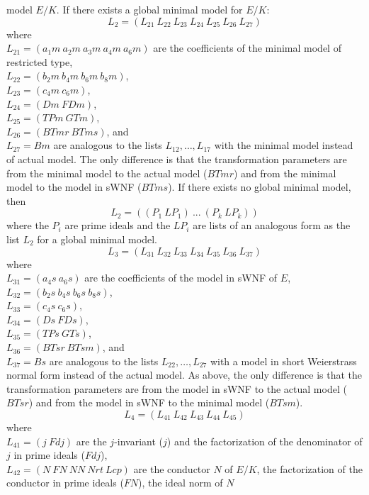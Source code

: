 model $E/K$.
\leer
If there exists a global minimal model for $E/K$:
$$
        L_2 = (L_{21}\  L_{22}\  L_{23}\  L_{24}\  L_{25}\  L_{26}\  L_{27})
$$
where \\
$L_{21} = (a_1m\  a_2m\  a_3m\  a_4m\ a_6m)$ are the coefficients of the 
minimal model of restricted type, \\
$L_{22} = (b_2m\  b_4m\  b_6m\  b_8m)$, \\
$L_{23} = (c_4m\  c_6m)$, \\
$L_{24} = (Dm\  FDm)$, \\
$L_{25} = (TPm\  GTm)$, \\
$L_{26} = (BTmr\  BTms)$, and \\
$L_{27} = Bm$ are analogous to the lists 
$L_{12}, \ldots, L_{17}$ with the minimal model instead of actual model. The 
only difference is that the transformation parameters are from the minimal
model to the actual model ($BTmr$) and from the minimal model to the model
in sWNF ($BTms$). 
\leer
If there exists no global minimal model, then 
$$
        L_2 = ((P_1\  LP_1)\ ...\ (P_k\  LP_k))
$$
where the $P_i$ are prime ideals and the $LP_i$ are lists of an analogous
form as the list $L_2$ for a global minimal model.
\leer
$$
        L_3 = (L_{31}\  L_{32}\  L_{33}\  L_{34}\  L_{35}\  L_{36}\  L_{37})
$$
where \\
$L_{31} = (a_4s\ a_6s)$ are the coefficients of the model in sWNF of $E$, \\
$L_{32} = (b_2s\  b_4s\  b_6s\  b_8s)$, \\
$L_{33} = (c_4s\  c_6s)$, \\
$L_{34} = (Ds\  FDs)$, \\
$L_{35} = (TPs\  GTs)$, \\
$L_{36} = (BTsr\  BTsm)$, and \\
$L_{37} = Bs$ are analogous to the lists 
$L_{22}, \ldots, L_{27}$ with a model in short Weierstrass normal form instead 
of the actual model. As above, the 
only difference is that the transformation parameters are from the model in
sWNF to the actual model ($BTsr$) and from the model in sWNF to the minimal
model ($BTsm$). 
\leer
$$
        L_4 = (L_{41}\  L_{42}\  L_{43}\  L_{44}\  L_{45})
$$
where \\
$L_{41} = (j\  Fdj)$ are the $j$-invariant ($j$) and the factorization of the
denominator of $j$ in prime ideals ($Fdj$), \\
$L_{42} = (N\  FN\  NN\ Nrt\  Lcp)$ are the conductor $N$ of $E/K$, the 
factorization of the conductor in prime ideals ($FN$), the ideal norm of $N$ 

